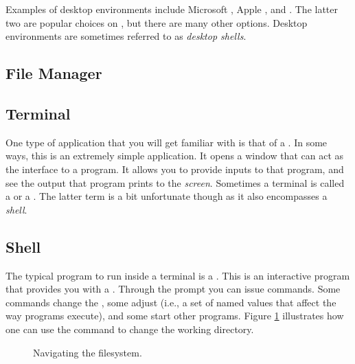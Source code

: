 Examples of desktop environments include Microsoft , Apple ,  and . The latter two are popular choices on , but there are many other options. Desktop environments are sometimes referred to as \textsl{desktop shells}.

\subsection{File Manager}

\subsection{Terminal}

One type of application that you will get familiar with is that of a . In some ways, this is an extremely simple application. It opens a window that can act as the interface to a  program. It allows you to provide inputs to that program, and see the output that program prints to the \textsl{screen}. Sometimes a terminal is called a  or a . The latter term is a bit unfortunate though as it also encompasses a \textsl{shell}.

\subsection{Shell}

The typical program to run inside a terminal is a . This is an interactive program that provides you with a . Through the prompt you can issue commands. Some commands change the , some adjust  (i.e., a set of named values that affect the way programs execute), and some start other programs. Figure \ref{fig:bg:processes:navigation} illustrates how one can use the  command to change the working directory.

\begin{figure}[tbp]
  
  \caption{Navigating the filesystem.}
  \label{fig:bg:processes:navigation}
\end{figure}

